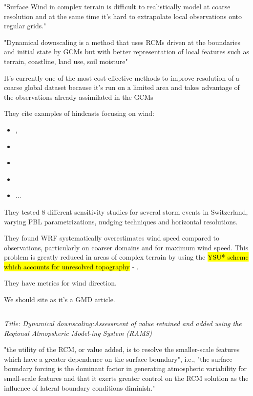 \documentclass[12pt,a4paper]{article}
\begin{document}
"Surface Wind in complex terrain is difficult to realistically model at coarse resolution and at the same time it's hard to extrapolate local observations onto regular grids."

"Dynamical downscaling is a method that uses RCMs driven at the boundaries and initial state by GCMs but with better representation of local features such as terrain, coastline, land use, soil moisture"

It's currently one of the most cost-effective methods to improve resolution of a coarse global dataset because it's run on a limited area and takes advantage of the observations already assimilated in the GCMs

They cite examples of hindcasts focusing on wind: 

\begin{itemize}
    \item \cite{Jimenez2010}, 
    \item \cite{Garcia-Diez2015}
    \item \cite{Menendez2014}
    \item \cite{Lorente-Plazas2015}
    \item ...
\end{itemize}

They tested 8 different sensitivity studies for several storm events in Switzerland, varying  \gls{PBL} parametrizations, nudging techniques and horizontal resolutions.

They found WRF systematically overestimates wind speed compared to observations, particularly on coarser domains and for maximum wind speed. This problem is greatly reduced in areas of complex terrain by using the \hl{YSU* scheme which accounts for unresolved topography} - \cite{Jimenez2013}. 

They have metrics for wind direction.

We should site as it's a GMD article.

\subsection{\cite{Castro2005}}

\textit{Title: Dynamical downscaling:Assessment of value retained and added using the Regional Atmopsheric Model-ing System (RAMS)}

"the utility of the RCM, or value added, is to resolve the smaller-scale features which have a greater dependence on the surface boundary", i.e., "the surface boundary forcing is the dominant factor in generating atmospheric variability for small-scale features and that it exerts greater control on the RCM solution as the influence of lateral boundary conditions diminish."
\end{document}
